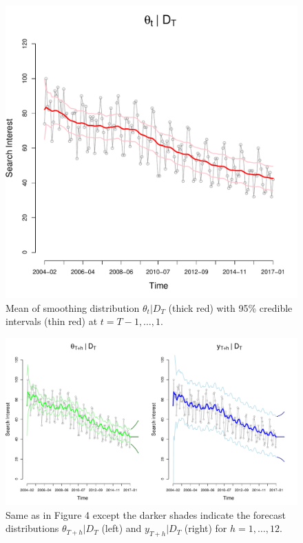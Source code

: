\documentclass[12pt]{article}
\begin{document}
\begin{figure}[H]
\begin{center}
\includegraphics[scale=0.36]{figs/smooth.pdf}
\end{center}
\caption{Mean of smoothing distribution $\theta_t|D_T$ (thick red) with 95\% credible intervals (thin red) at $t=T-1,\ldots,1$.}
\end{figure}

\begin{figure}[H]
\begin{center}
\includegraphics[scale=0.36]{figs/forecast.pdf}
\end{center}
\caption{Same as in Figure 4 except the darker shades indicate the forecast distributions $\theta_{T+h}|D_T$ (left) and $y_{T+h}|D_T$ (right) for $h=1,\ldots,12$.}
\end{figure}
\end{document}
